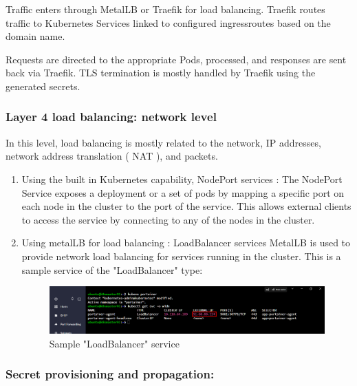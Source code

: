 \hspace{7mm}Traffic enters through MetalLB or Traefik for load balancing. Traefik routes traffic to Kubernetes Services linked to configured ingressroutes based on the domain name.

\hspace{7mm}Requests are directed to the appropriate Pods, processed, and responses are sent back via Traefik. TLS termination is mostly handled by Traefik using the generated secrets.

\subsubsection{Layer 4 load balancing: network level }

\hspace{7mm}In this level, load balancing is mostly related to the network, IP addresses, network address translation ( NAT ), and packets. 

\begin{enumerate}[label = (\alph*)]

\item Using the built in Kubernetes capability, NodePort services : The NodePort Service exposes a deployment or a set of pods by mapping a specific port on each node in the cluster to the port of the service. 
This allows external clients to access the service by connecting to any of the nodes in the cluster.

\item Using metalLB for load balancing : LoadBalancer services 
MetalLB is used to provide network load balancing for services running in the cluster. This is a sample service of the "LoadBalancer" type: 

\begin{figure}[H]\centering
\includegraphics[width=1.0\textwidth,angle=00]{assets/f23.png}
\caption{Sample "LoadBalancer" service }
\label{fig:LoadBalancer}
\end{figure}

\end{enumerate}


\subsubsection{Secret provisioning and propagation:}

